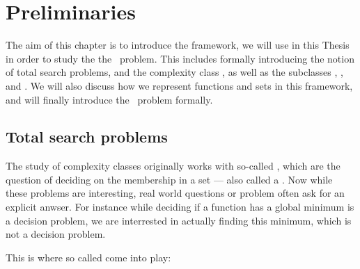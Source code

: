 \setchapterpreamble[u]{\margintoc}
\chapter{Preliminaries}

The aim of this chapter is to introduce the framework, we will use in this Thesis in order to study the the \Tarski\ problem. This includes formally introducing the notion of total search problems, and the complexity class \TFNP, as well as the subclasses \PLS, \PPAD, and \EOPL. We will also discuss how we represent functions and sets in this framework, and will finally introduce the \Tarski\ problem formally.

\section{Total search problems}

The study of complexity classes originally works with so-called , which are the question of deciding on the membership in a set --- also called a .  Now while these problems are interesting, real world questions or problem often ask for an explicit anwser. For instance while deciding if a function has a global minimum is a decision problem, we are interrested in actually finding this minimum, which is not a decision problem.

This is where so called  come into play:


